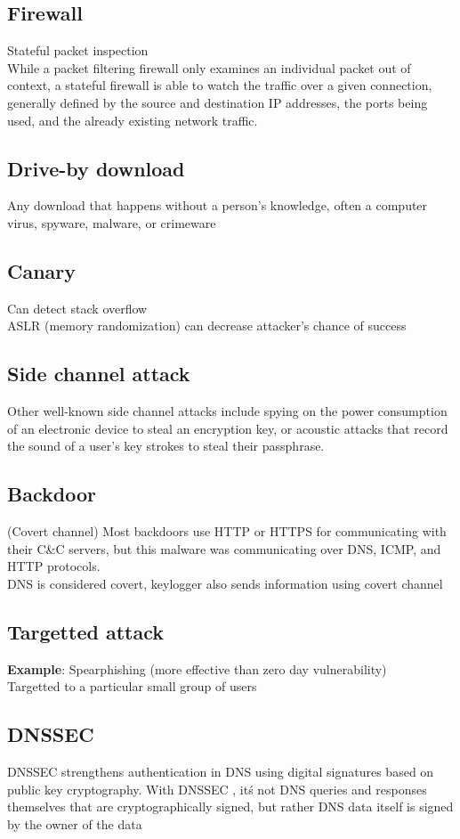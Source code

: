 \documentclass[11pt]{article}
\begin{document}
\begin{multicols*}{3}
\subsection*{Firewall}
Stateful packet inspection\\
While a packet filtering firewall only examines an individual packet out of context, a stateful firewall is able to watch the traffic over a given connection, generally defined by the source and destination IP addresses, the ports being used, and the already existing network traffic.
\subsection*	{Drive-by download}
Any download that happens without a person's knowledge, often a computer virus, spyware, malware, or crimeware
\subsection*	{Canary}
Can detect stack overflow\\
ASLR (memory randomization) can decrease attacker's chance of success
\subsection*{Side channel attack}
Other well-known side channel attacks include spying on the power consumption of an electronic device to steal an encryption key, or acoustic attacks that record the sound of a user's key strokes to steal their passphrase.\\
\subsection*{Backdoor}
(Covert channel) Most backdoors use HTTP or HTTPS for communicating with their C&C servers, but this malware was communicating over DNS, ICMP, and HTTP protocols.
\\
DNS is considered covert, keylogger also sends information using covert channel
\subsection*{Targetted attack}
\textbf{Example}: Spearphishing (more effective than zero day vulnerability)\\
Targetted to a particular small group of users
\subsection*{DNSSEC}
DNSSEC strengthens authentication in DNS using digital signatures based on public key cryptography. With DNSSEC , it\'s not DNS queries and responses themselves that are cryptographically signed, but rather DNS data itself is signed by the owner of the data

\end{multicols*}
\end{document}
